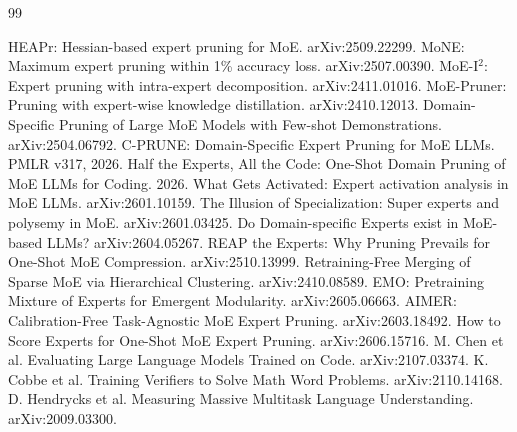 \documentclass[11pt]{article}
\begin{document}
\begin{thebibliography}{99}
\raggedright
{} HEAPr: Hessian-based expert pruning for MoE. arXiv:2509.22299.
 MoNE: Maximum expert pruning within 1\% accuracy loss. arXiv:2507.00390.
 MoE-I$^2$: Expert pruning with intra-expert decomposition. arXiv:2411.01016.
 MoE-Pruner: Pruning with expert-wise knowledge distillation. arXiv:2410.12013.
 Domain-Specific Pruning of Large MoE Models with Few-shot Demonstrations. arXiv:2504.06792.
 C-PRUNE: Domain-Specific Expert Pruning for MoE LLMs. PMLR v317, 2026.
 Half the Experts, All the Code: One-Shot Domain Pruning of MoE LLMs for Coding. 2026.
 What Gets Activated: Expert activation analysis in MoE LLMs. arXiv:2601.10159.
 The Illusion of Specialization: Super experts and polysemy in MoE. arXiv:2601.03425.
 Do Domain-specific Experts exist in MoE-based LLMs? arXiv:2604.05267.
 REAP the Experts: Why Pruning Prevails for One-Shot MoE Compression. arXiv:2510.13999.
 Retraining-Free Merging of Sparse MoE via Hierarchical Clustering. arXiv:2410.08589.
 EMO: Pretraining Mixture of Experts for Emergent Modularity. arXiv:2605.06663.
 AIMER: Calibration-Free Task-Agnostic MoE Expert Pruning. arXiv:2603.18492.
 How to Score Experts for One-Shot MoE Expert Pruning. arXiv:2606.15716.
 M. Chen et al. Evaluating Large Language Models Trained on Code. arXiv:2107.03374.
 K. Cobbe et al. Training Verifiers to Solve Math Word Problems. arXiv:2110.14168.
 D. Hendrycks et al. Measuring Massive Multitask Language Understanding. arXiv:2009.03300.
\end{thebibliography}
\end{document}
